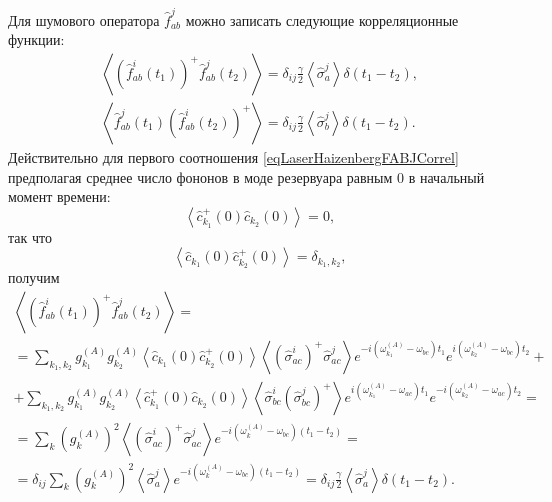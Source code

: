 Для шумового оператора $\hat{f}_{ab}^{j}$ можно записать следующие
корреляционные функции:
\begin{eqnarray}
\left<\left(\hat{f}_{ab}^{i}\left(t_1\right)\right)^{+}\hat{f}_{ab}^{j}\left(t_2\right)\right>
= \delta_{ij}
\frac{\gamma}{2}\left<\hat{\sigma}^{j}_{a}\right>\delta\left(t_1 -
t_2\right),
\nonumber \\
\left<\hat{f}_{ab}^{j}\left(t_1\right)\left(\hat{f}_{ab}^{i}\left(t_2\right)\right)^{+}\right>
= \delta_{ij}
\frac{\gamma}{2}\left<\hat{\sigma}^{j}_{b}\right>\delta\left(t_1 -
t_2\right).
\label{eqLaserHaizenbergFABJCorrel}
\end{eqnarray}
Действительно для первого соотношения
\eqref{eqLaserHaizenbergFABJCorrel} предполагая среднее число фононов
в моде резервуара равным $0$ в начальный момент времени:
\begin{equation}
\left<\hat{c}_{k_1}^{+}\left(0\right)\hat{c}_{k_2}\left(0\right)\right>
= 0,
\nonumber
\end{equation}
так что
\begin{equation}
\left<\hat{c}_{k_1}\left(0\right)\hat{c}_{k_2}^{+}\left(0\right)\right>
= \delta_{k_1,k_2},
\nonumber
\end{equation}
получим
\begin{eqnarray}
\left<\left(\hat{f}_{ab}^{i}\left(t_1\right)\right)^{+}\hat{f}_{ab}^{j}\left(t_2\right)\right>
= 
\nonumber \\
=
\sum_{k_1,k_2}
g_{k_1}^{(A)}g_{k_2}^{(A)}
\left<\hat{c}_{k_1}\left(0\right)\hat{c}_{k_2}^{+}\left(0\right)\right>
\left<\left(\hat{\sigma}^{i}_{ac}\right)^{+}\hat{\sigma}^{j}_{ac}\right>  
e^{- i\left(\omega_{k_1}^{(A)} - \omega_{bc}\right)t_1}
e^{i\left(\omega_{k_2}^{(A)} - \omega_{bc}\right)t_2} +
\nonumber \\
+
\sum_{k_1,k_2}
g_{k_1}^{(A)}g_{k_2}^{(A)}
\left<\hat{c}_{k_1}^{+}\left(0\right)\hat{c}_{k_2}\left(0\right)\right>
\left<\hat{\sigma}^{i}_{bc}\left(\hat{\sigma}^{j}_{bc}\right)^{+}\right>
e^{i\left(\omega_{k_1}^{(A)} -
  \omega_{ac}\right)t_1}e^{-i\left(\omega_{k_2}^{(A)} -
  \omega_{ac}\right)t_2} = 
\nonumber \\
= 
\sum_{k}
\left(g_{k}^{(A)}\right)^2
\left<\left(\hat{\sigma}^{i}_{ac}\right)^{+}\hat{\sigma}^{j}_{ac}\right>  
e^{- i\left(\omega_{k}^{(A)} - \omega_{bc}\right)\left(t_1 -
  t_2\right)} = 
\nonumber \\
=
\delta_{ij}
\sum_{k}
\left(g_{k}^{(A)}\right)^2 
\left<\hat{\sigma}^{j}_{a}\right>  
e^{- i\left(\omega_{k}^{(A)} - \omega_{bc}\right)\left(t_1 -
  t_2\right)} = 
\delta_{ij}
\frac{\gamma}{2}\left<\hat{\sigma}^{j}_{a}\right>\delta\left(t_1 - t_2\right).
\nonumber
\end{eqnarray}


